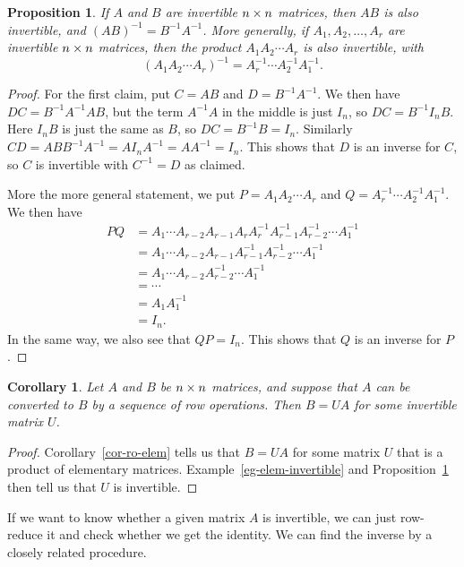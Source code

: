 \documentclass[reqno]{amsart}
\newtheorem{proposition}[theorem]{Proposition}
\newtheorem{corollary}[theorem]{Corollary}
\theoremstyle{definition}
\begin{document}
\begin{proposition}\label{prop-product-inverse}
 If $A$ and $B$ are invertible $n\times n$ matrices, then $AB$ is also
 invertible, and $(AB)^{-1}=B^{-1}A^{-1}$.  More generally, if
 $A_1,A_2,\dotsc,A_r$ are invertible $n\times n$ matrices, then the
 product $A_1A_2\dotsb A_r$ is also invertible, with 
 \[ (A_1A_2\dotsb A_r)^{-1} = A_r^{-1} \dotsb A_2^{-1} A_1^{-1}. \]
\end{proposition}
\begin{proof}
 For the first claim, put $C=AB$ and $D=B^{-1}A^{-1}$.  We then have 
 $DC=B^{-1}A^{-1}AB$, but the term $A^{-1}A$ in the middle is just
 $I_n$, so $DC=B^{-1}I_nB$.  Here $I_nB$ is just the same as $B$, so
 $DC=B^{-1}B=I_n$.  Similarly
 $CD=ABB^{-1}A^{-1}=AI_nA^{-1}=AA^{-1}=I_n$.  This shows that $D$ is
 an inverse for $C$, so $C$ is invertible with $C^{-1}=D$ as claimed.

 More the more general statement, we put $P=A_1A_2\dotsb A_r$ and
 $Q=A_r^{-1}\dotsb A_2^{-1}A_1^{-1}$.  We then have
 \begin{align*}
  PQ &= A_1\dotsb A_{r-2}A_{r-1}A_r 
        A_r^{-1}A_{r-1}^{-1}A_{r-2}^{-1}\dotsb A_1^{-1} \\
     &= A_1\dotsb A_{r-2}A_{r-1} 
        A_{r-1}^{-1}A_{r-2}^{-1}\dotsb A_1^{-1} \\
     &= A_1\dotsb A_{r-2}
        A_{r-2}^{-1}\dotsb A_1^{-1} \\
     &= \dotsb \\
     &= A_1A_1^{-1} \\
     &= I_n.
 \end{align*}
 In the same way, we also see that $QP=I_n$.  This shows that $Q$ is
 an inverse for $P$.
\end{proof}

\begin{corollary}\label{cor-ro-elem-ii}
 Let $A$ and $B$ be $n\times n$ matrices, and suppose that $A$ can be
 converted to $B$ by a sequence of row operations.  Then $B=UA$ for
 some invertible matrix $U$.
\end{corollary}
\begin{proof}
 Corollary~\ref{cor-ro-elem} tells us that $B=UA$ for some matrix $U$
 that is a product of elementary matrices.
 Example~\ref{eg-elem-invertible} and
 Proposition~\ref{prop-product-inverse} then tell us that $U$ is
 invertible.  
\end{proof}

If we want to know whether a given matrix $A$ is invertible, we can
just row-reduce it and check whether we get the identity.  We can find
the inverse by a closely related procedure.
\end{document}

